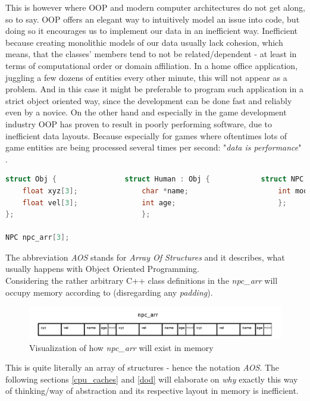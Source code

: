 This is however where OOP and modern computer architectures do not get along, so to say. OOP offers an elegant way to intuitively model an issue into code, but doing so it encourages us to implement our data in an inefficient way. Inefficient because creating monolithic models of our data usually lack cohesion, which means, that the classes' members tend to not be related/dependent  - at least in terms of computational order or domain affiliation. In a home office application, juggling a few dozens of entities every other minute, this will not appear as a problem. And in this case it might be preferable to program such application in a strict object oriented way, since the development can be done fast and reliably even by a novice. On the other hand and especially in the game development industry OOP has proven to result in poorly performing software, due to inefficient data layouts. Because especially for games where oftentimes lots of game entities are being processed several times per second: "\textit{data is performance}" .\\
 \begin{lstlisting}[language=C++,numbers=none,name={Example of some hierarchical POD class definitions},label={pods}]
struct Obj {				struct Human : Obj {			struct NPC : Human {
	float xyz[3];				char *name;						int mood;
	float vel[3];				int age;						};
};								};

NPC npc_arr[3];
 \end{lstlisting}
The abbreviation \textit{AOS} stands for \textit{Array Of Structures} and it describes, what usually happens with Object Oriented Programming.\\
Considering the rather arbitrary C++ class definitions in  the \textit{npc\_arr} will occupy memory according to  (disregarding any \textit{padding}).
\begin{figure}[!htbp]
	\centering
	\includegraphics[width=1.0\linewidth]{PICs/npcs_in_memory}
	\caption{Visualization of how \textit{npc\_arr} will exist in memory}\label{npcs_in_memory}
\end{figure}
This is quite literally an array of structures - hence the notation \textit{AOS}. The following sections \ref{cpu_caches} and \ref{dod} will elaborate on \textit{why} exactly this way of thinking/way of abstraction and its respective layout in memory is inefficient.

